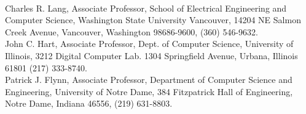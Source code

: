 \documentclass[12pt]{article}
\begin{document}



\vspace{0.25cm}

\\

Charles R. Lang, Associate Professor,
School of Electrical Engineering and Computer Science,
Washington State University Vancouver,
14204 NE Salmon Creek Avenue,
Vancouver, Washington 98686-9600,
(360) 546-9632.\\

John C. Hart, Associate Professor,
Dept. of Computer Science,
University of Illinois,
3212 Digital Computer Lab.
1304 Springfield Avenue,
Urbana, Illinois 61801
(217) 333-8740.\\

Patrick J. Flynn, Associate Professor,
Department of Computer Science and Engineering,
University of Notre Dame,
384 Fitzpatrick Hall of Engineering,
Notre Dame, Indiana 46556,
(219) 631-8803.\\

\end{document}

